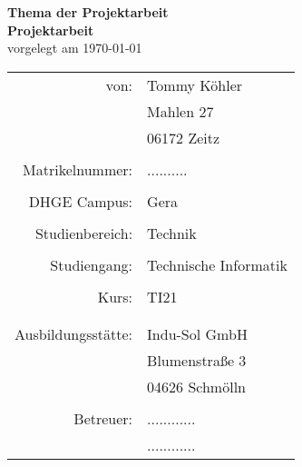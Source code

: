 \thispagestyle{empty}

\begin{center}
	{\LARGE \textbf{Thema der Projektarbeit}}\\
	\vspace{2.0cm}				%
	{\Huge \textbf{Projektarbeit}}\\
	\vspace{1.0cm}
	vorgelegt am \today\\
	\vspace{2.0cm}
	
\begin{tabular}{rl}
	von:				& Tommy Köhler\\
						& Mahlen 27\\
						& 06172 Zeitz\\
						& \\
	Matrikelnummer: 	& ..........\\
						& \\
	DHGE Campus:		& Gera\\
						& \\
	Studienbereich:		& Technik\\
						& \\
	Studiengang:		& Technische Informatik\\
						& \\
	Kurs:				& TI21\\
						& \\
						& \\
	Ausbildungsstätte:	& Indu-Sol GmbH\\
						& Blumenstraße 3\\
						& 04626 Schmölln\\
						& \\
	Betreuer:			& ............ \\
						& ............ \\
						
						
\end{tabular}
\end{center}